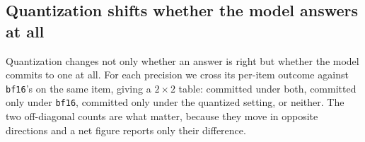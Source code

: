 \documentclass[conference]{IEEEtran}
\begin{document}


\subsection{Quantization shifts whether the model answers at all}
\label{sec:h4}
%
Quantization changes not only whether an answer is right but whether the model
commits to one at all. For each precision we cross its per-item outcome against
\texttt{bf16}'s on the same item, giving a $2\times2$ table: committed under both,
committed only under \texttt{bf16}, committed only under the quantized setting, or
neither. The two off-diagonal counts are what matter, because they move in opposite
directions and a net figure reports only their difference.

\begin{table}[t]
\centering
\caption{Compliance transitions against \texttt{bf16} on the same items, pooled over
the three models, at \hFourRung{} extraction. \emph{chg.} is the number of items that
changed commitment state in either direction; \emph{net} is the resulting change in
commitment rate in percentage points; $\neq$0 counts how many of the underlying
per-model cells exclude the null under an exact McNemar test. \textbf{Bold} marks a net
with at least one such cell. $^{*}$GSM8K\textsubscript{hash} is shown as a demonstration
and excluded from the registered family (\S\ref{sec:h3}).}
\label{tab:h4-transitions}
\small

\end{table}
\end{document}
